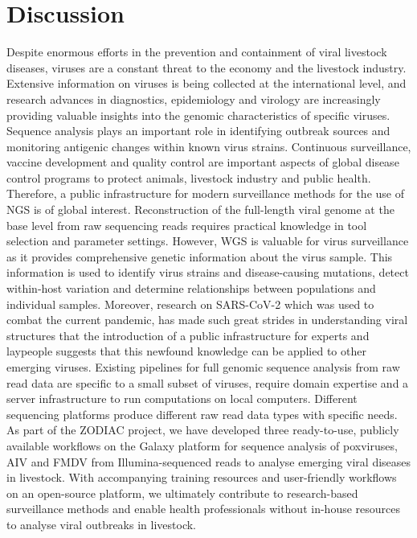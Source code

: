 \chapter{Discussion}\label{chap:discussion}
Despite enormous efforts in the prevention and containment of viral livestock diseases, viruses are a constant threat to the economy and the livestock industry. Extensive information on viruses is being collected at the international level, and research advances in diagnostics, epidemiology and virology are increasingly providing valuable insights into the genomic characteristics of specific viruses. Sequence analysis plays an important role in identifying outbreak sources and monitoring antigenic changes within known virus strains. Continuous surveillance, vaccine development and quality control are important aspects of global disease control programs to protect animals, livestock industry and public health. Therefore, a public infrastructure for modern surveillance methods for the use of \ac{NGS} is of global interest. Reconstruction of the full-length viral genome at the base level from raw sequencing reads requires practical knowledge in tool selection and parameter settings. However, \ac{WGS} is valuable for virus surveillance as it provides comprehensive genetic information about the virus sample. This information is used to identify virus strains and disease-causing mutations, detect within-host variation and determine relationships between populations and individual samples. Moreover, research on \ac{SARS-CoV-2} which was used to combat the current pandemic, has made such great strides in understanding viral structures that the introduction of a public infrastructure for experts and laypeople suggests that this newfound knowledge can be applied to other emerging viruses. Existing pipelines for full genomic sequence analysis from raw read data are specific to a small subset of viruses, require domain expertise and a server infrastructure to run computations on local computers. Different sequencing platforms produce different raw read data types with specific needs. As part of the \ac{ZODIAC} project, we have developed three ready-to-use, publicly available workflows on the Galaxy platform for sequence analysis of poxviruses, \ac{AIV} and \ac{FMDV} from Illumina-sequenced reads to analyse emerging viral diseases in livestock. With accompanying training resources and user-friendly workflows on an open-source platform, we ultimately contribute to research-based surveillance methods and enable health professionals without in-house resources to analyse viral outbreaks in livestock.

